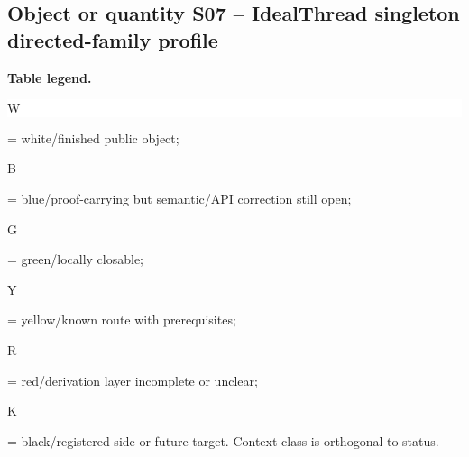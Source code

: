 \subsection*{Object or quantity S07 -- IdealThread singleton directed-family profile}
\hypertarget{objproof:S07}{}
\par\smallskip\noindent\begin{minipage}{0.99\linewidth}\footnotesize\raggedright\textbf{Table legend.} \colorbox{white}{\strut W} = white/finished public object; \colorbox{cyan!20}{\strut B} = blue/proof-carrying but semantic/API correction still open; \colorbox{green!18}{\strut G} = green/locally closable; \colorbox{yellow!25}{\strut Y} = yellow/known route with prerequisites; \colorbox{red!20}{\strut R} = red/derivation layer incomplete or unclear; \colorbox{black!18}{\strut K} = black/registered side or future target. Context class is orthogonal to status.\end{minipage}\par\vspace{0.25em}
